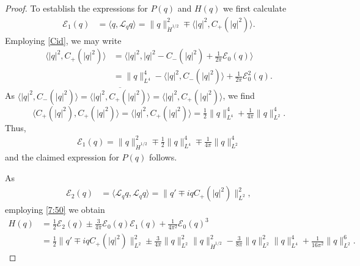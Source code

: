 \documentclass{amsart}
\numberwithin{equation}{section}
\theoremstyle{definition}
\newcommand{\Lc}{\mathcal{L}}
\newcommand{\lan}{\langle}
\newcommand{\ran}{\rangle}
\begin{document}
\begin{proof}
To establish the expressions for $P(q)$ and $H(q)$ we first calculate
\begin{align*}
\mathcal{E}_1(q)&=\lan q,\Lc_qq\ran=\|q\|_{\dot{H}^{1/2}}^2\mp\lan |q|^2, C_+(|q|^2)\ran.
\end{align*}
Employing \eqref{Cid}, we may write
\begin{align*}
\lan |q|^2, C_+(|q|^2)\ran&=\lan |q|^2,|q|^2-C_-(|q|^2)+\tfrac1{2\pi}\mathcal{E}_0(q)\ran\\
&=\|q\|_{L^4}^4-\lan |q|^2,C_-(|q|^2)\ran+\tfrac1{2\pi}\mathcal{E}_0^2(q).
\end{align*}
As $\lan |q|^2,C_-(|q|^2)\ran=\overline{\lan |q|^2,C_+(|q|^2)\ran}=\lan |q|^2,C_+(|q|^2)\ran$, we find
\begin{equation}\label{eqn:norm_Cp_q^2}
\lan C_+ (|q|^2),C_+(|q|^2)\ran=\lan |q|^2,C_+(|q|^2)\ran=\tfrac12\|q\|_{L^4}^4+\tfrac1{4\pi}\|q\|_{L^2}^4.
\end{equation}
Thus,
\begin{align}\label{7:50}
\mathcal{E}_1(q)=\|q\|_{\dot{H}^{1/2}}^2\mp\tfrac12\|q\|_{L^4}^4\mp\tfrac1{4\pi}\|q\|_{L^2}^4
\end{align}
and the claimed expression for $P(q)$ follows.

As 
\begin{align}\label{5:08}
\mathcal{E}_2(q)&=\lan \Lc_qq,\Lc_qq\ran=\|q'\mp i qC_+(|q|^2)\|_{L^2}^2,
\end{align}
employing \eqref{7:50} we obtain
\begin{align*}
H(q)&=\tfrac12\mathcal{E}_2(q)\pm\tfrac{3}{4\pi}\mathcal{E}_0(q)\mathcal{E}_1(q)+\tfrac{1}{4\pi^2}\mathcal{E}_0(q)^3\\
&=\tfrac12\|q'\mp i qC_+(|q|^2)\|_{L^2}^2\pm \tfrac{3}{4\pi} \|q\|_{L^2}^2\|q\|_{\dot{H}^{1/2}}^2-\tfrac{3}{8\pi}\|q\|_{L^2}^2\|q\|_{L^4}^4+\tfrac{1}{16\pi^2}\|q\|_{L^2}^6.
\end{align*}


\end{proof}
\end{document}
